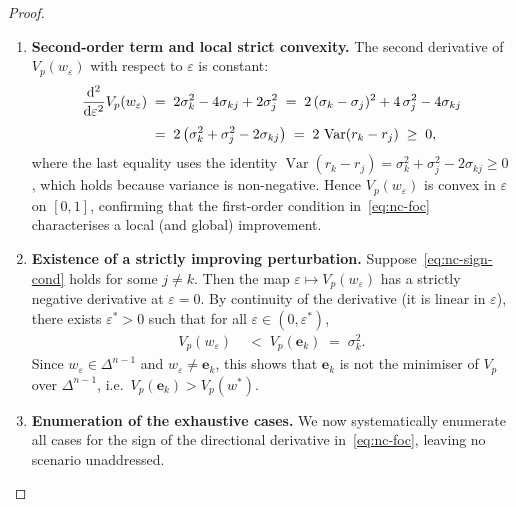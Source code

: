 \documentclass[12pt,openany]{book}
\newcommand{\bfw}{\mathbf{w}}
\newcommand{\bfe}{\mathbf{e}}
\DeclareMathOperator{\Var}{Var}
\numberwithin{equation}{chapter}
\theoremstyle{plain}
\theoremstyle{definition}
\theoremstyle{remark}
\def\bfw{w}%
\begin{document}
\begin{proof}
\begin{enumerate}
  \item \textbf{Second-order term and local strict convexity.}
        The second derivative of $V_p(\bfw_\varepsilon)$ with
        respect to $\varepsilon$ is constant:
        \begin{align}
          \frac{\mathrm{d}^2}{\mathrm{d}\varepsilon^2}
          V_p(\bfw_\varepsilon)
          &\;=\; 2\sigma_k^2 - 4\sigma_{kj} + 2\sigma_j^2
           \;=\; 2\,(\sigma_k - \sigma_j)^2
                 + 4\,\sigma_j^2 - 4\sigma_{kj}
          \notag\\[4pt]
          &\;=\; 2\,\bigl(\sigma_k^2 + \sigma_j^2 - 2\sigma_{kj}\bigr)
           \;=\; 2\,\Var(r_k - r_j) \;\geq\; 0,
          \label{eq:nc-second-deriv}
        \end{align}
        where the last equality uses the identity
        $\Var(r_k - r_j)
        = \sigma_k^2 + \sigma_j^2 - 2\sigma_{kj} \geq 0$,
        which holds because variance is non-negative.
        Hence $V_p(\bfw_\varepsilon)$ is convex in $\varepsilon$
        on $[0,1]$, confirming that the first-order condition
        in~\eqref{eq:nc-foc} characterises a local (and global)
        improvement.

  \item \textbf{Existence of a strictly improving perturbation.}
        Suppose~\eqref{eq:nc-sign-cond} holds for some $j \neq k$.
        Then the map $\varepsilon \mapsto V_p(\bfw_\varepsilon)$
        has a strictly negative derivative at $\varepsilon = 0$.
        By continuity of the derivative (it is linear in
        $\varepsilon$), there exists $\varepsilon^* > 0$ such that
        for all $\varepsilon \in (0,\varepsilon^*)$,
        \begin{align}
          V_p(\bfw_\varepsilon)
          &\;<\; V_p(\bfe_k) \;=\; \sigma_k^2.
          \label{eq:nc-improvement}
        \end{align}
        Since $\bfw_\varepsilon \in \Delta^{n-1}$ and
        $\bfw_\varepsilon \neq \bfe_k$, this shows that
        $\bfe_k$ is not the minimiser of $V_p$ over
        $\Delta^{n-1}$, i.e.\ $V_p(\bfe_k) > V_p(\bfw^*)$.

  \item \textbf{Enumeration of the exhaustive cases.}
        We now systematically enumerate all cases for the sign
        of the directional derivative in~\eqref{eq:nc-foc},
        leaving no scenario unaddressed.


\end{enumerate}
\end{proof}
\end{document}
